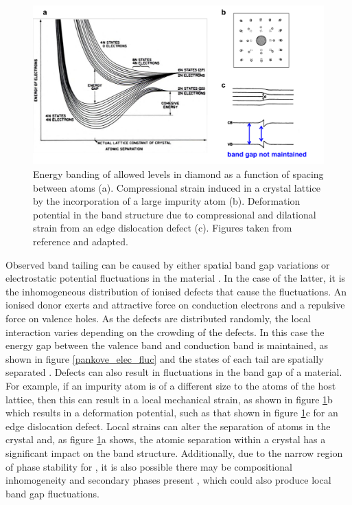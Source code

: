 \documentclass[11pt, twoside]{report}
\begin{document}
\begin{figure}[h!]
  \centering
    \includegraphics[width=1.0\textwidth]{figures/pankove_band_fluc.png}
    \caption[Energy banding of allowed levels in diamond as a function of spacing between atoms (a). Compressional strain induced in a crystal lattice by the incorporation of a large impurity atom (b). Deformation potential in the band structure due to compressional and dilational strain from an edge dislocation defect (c).]{Energy banding of allowed levels in diamond as a function of spacing between atoms (a). Compressional strain induced in a crystal lattice by the incorporation of a large impurity atom (b). Deformation potential in the band structure due to compressional and dilational strain from an edge dislocation defect (c). Figures taken from reference  and adapted.}
  \label{pankove_band_fluc}
\end{figure}

Observed band tailing can be caused by either spatial band gap variations or electrostatic potential fluctuations in the material \cite{band_tail}. In the case of the latter, it is the inhomogeneous distribution of ionised defects that cause the fluctuations. An ionised donor exerts and attractive force on conduction electrons and a repulsive force on valence holes. As the defects are distributed randomly, the local interaction varies depending on the crowding of the defects. In this case the energy gap between the valence band and conduction band is maintained, as shown in figure \ref{pankove_elec_fluc} and the states of each tail are spatially separated \cite{Pankove}. Defects can also result in fluctuations in the band gap of a material. For example, if an impurity atom is of a different size to the atoms of the host lattice, then this can result in a local mechanical strain, as shown in figure \ref{pankove_band_fluc}b which results in a deformation potential, such as that shown in figure \ref{pankove_band_fluc}c for an edge dislocation defect. Local strains can alter the separation of atoms in the crystal and, as figure \ref{pankove_band_fluc}a shows, the atomic separation within a crystal has a significant impact on the band structure. Additionally, due to the narrow region of phase stability for {\CZTS}, it is also possible there may be compositional inhomogeneity and secondary phases present \cite{SandS}, which could also produce local band gap fluctuations. 
\end{document}

